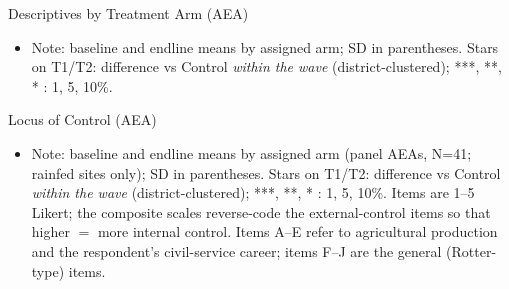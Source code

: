 \documentclass[aspectratio=169]{beamer}
\newcommand{\notefont}{\fontsize{5pt}{6pt}\selectfont}
\begin{document}
\begin{frame}{Descriptives by Treatment Arm (AEA)}
	\centering
	\begin{itemize}\notefont
		\item Note: baseline and endline means by assigned arm; SD in parentheses. Stars on T1/T2:
		difference vs Control \emph{within the wave} (district-clustered); ***, **, * : 1, 5, 10\%.
	\end{itemize}
\end{frame}









	







\begin{frame}{Locus of Control (AEA)}
	\centering
	\begin{itemize}\notefont
		\item Note: baseline and endline means by assigned arm (panel AEAs, N=41; rainfed sites only); SD in
		parentheses. Stars on T1/T2: difference vs Control \emph{within the wave}
		(district-clustered); ***, **, * : 1, 5, 10\%. Items are 1--5 Likert; the composite
		scales reverse-code the external-control items so that higher $=$ more internal control.
		Items A--E refer to agricultural production and the respondent's civil-service career;
		items F--J are the general (Rotter-type) items.
	\end{itemize}
\end{frame}
\end{document}

